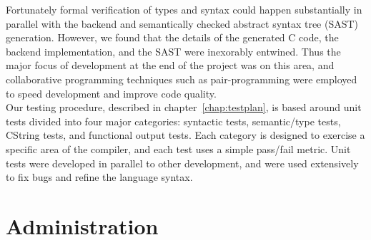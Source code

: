 Fortunately formal verification of types and syntax could happen substantially in parallel
with the backend and semantically checked abstract syntax tree (SAST) generation. However, we found
that the details of the generated C code, the backend implementation, and the SAST were
inexorably entwined. Thus the major focus of development at the end of the project was on
this area, and collaborative programming techniques such as pair-programming were employed to
speed development and improve code quality.
\\ %

Our testing procedure, described in chapter~\ref{chap:testplan}, is based around unit tests
divided into four major categories: syntactic tests, semantic/type tests, CString tests, and
functional output tests. Each category is designed to exercise a specific area of the \sys{}
compiler, and each test uses a simple pass/fail metric. Unit tests were developed in parallel
to other development, and were used extensively to fix bugs and refine the language syntax.

\section{Administration}

